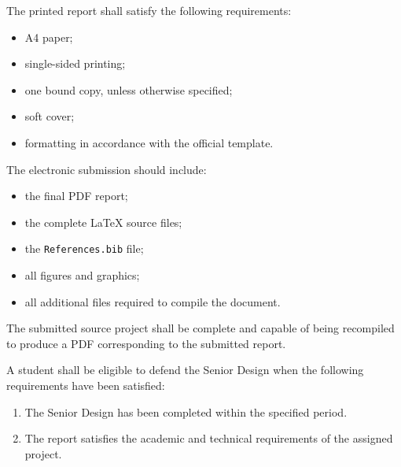 {

The printed report shall satisfy the following requirements:

\begin{itemize}[leftmargin=0.8cm, itemsep=2pt]
    \item A4 paper;
    \item single-sided printing;
    \item one bound copy, unless otherwise specified;
    \item soft cover;
    \item formatting in accordance with the official template.
\end{itemize}

The electronic submission should include:

\begin{itemize}[leftmargin=0.8cm, itemsep=2pt]
    \item the final PDF report;
    \item the complete \LaTeX{} source files;
    \item the \verb|References.bib| file;
    \item all figures and graphics;
    \item all additional files required to compile the document.
\end{itemize}

The submitted source project shall be complete and capable of being
recompiled to produce a PDF corresponding to the submitted report.

\vspace{0.3cm}



A student shall be eligible to defend the Senior Design when the
following requirements have been satisfied:

\begin{enumerate}[label=\arabic*., leftmargin=1.2cm, itemsep=2pt]

    \item The Senior Design has been completed within the specified
    period.

    \item The report satisfies the academic and technical requirements
    of the assigned project.


\end{enumerate}}
